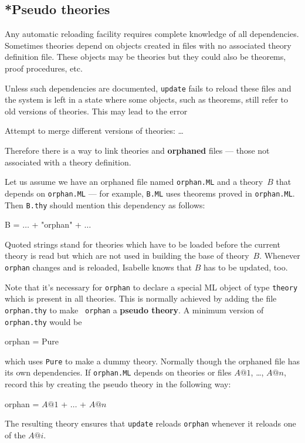 \subsection{*Pseudo theories}\label{sec:pseudo-theories}
%
Any automatic reloading facility requires complete knowledge of all
dependencies.  Sometimes theories depend on objects created in \ML{} files
with no associated theory definition file.  These objects may be theories but
they could also be theorems, proof procedures, etc.

Unless such dependencies are documented, {\tt update} fails to reload these
\ML{} files and the system is left in a state where some objects, such as
theorems, still refer to old versions of theories.  This may lead to the
error
\begin{ttbox}
Attempt to merge different versions of theories: \dots
\end{ttbox}
Therefore there is a way to link theories and {\bf orphaned} \ML{} files ---
those not associated with a theory definition.

Let us assume we have an orphaned \ML{} file named {\tt orphan.ML} and a
theory~$B$ that depends on {\tt orphan.ML} --- for example, {\tt B.ML} uses
theorems proved in {\tt orphan.ML}.  Then {\tt B.thy} should
mention this dependency as follows:
\begin{ttbox}
B = \(\ldots\) + "orphan" + \(\ldots\)
\end{ttbox}
Quoted strings stand for theories which have to be loaded before the
current theory is read but which are not used in building the base of
theory~$B$.  Whenever {\tt orphan} changes and is reloaded, Isabelle
knows that $B$ has to be updated, too.

Note that it's necessary for {\tt orphan} to declare a special ML
object of type {\tt theory} which is present in all theories.  This is
normally achieved by adding the file {\tt orphan.thy} to make {\tt
orphan} a {\bf pseudo theory}.  A minimum version of {\tt orphan.thy}
would be

\begin{ttbox}
orphan = Pure
\end{ttbox}

which uses {\tt Pure} to make a dummy theory.  Normally though the
orphaned file has its own dependencies.  If {\tt orphan.ML} depends on
theories or files $A@1$, \ldots, $A@n$, record this by creating the
pseudo theory in the following way:
\begin{ttbox}
orphan = \(A@1\) + \(\ldots\) + \(A@n\)
\end{ttbox}
The resulting theory ensures that {\tt update} reloads {\tt orphan}
whenever it reloads one of the $A@i$.

